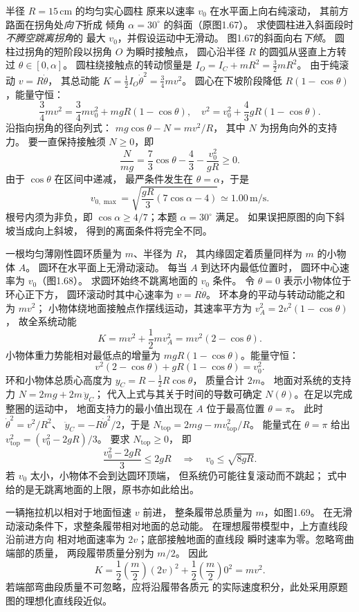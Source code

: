 半径 $R=15\,\mathrm{cm}$ 的均匀实心圆柱
原来以速率 $v_0$ 在水平面上向右纯滚动，
其前方路面在拐角处\emph{向下}折成
倾角 $\alpha=30^\circ$ 的斜面（原图1.67）。
求使圆柱进入斜面段时\emph{不腾空跳离拐角}的
最大 $v_0$，并假设运动中无滑动。
\exsolution
图1.67的斜面向右\emph{下倾}。
圆柱过拐角的短阶段以拐角 $O$ 为瞬时接触点，
圆心沿半径 $R$ 的圆弧从竖直上方转过
$\theta\in[0,\alpha]$。
圆柱绕接触点的转动惯量是
$I_O=I_C+mR^2=\frac32mR^2$。
由于纯滚动 $v=R\dot\theta$，
其总动能 $K=\frac12I_O\dot\theta^2
=\frac34mv^2$。
圆心在下坡阶段降低
$R(1-\cos\theta)$，能量守恒：
\[
\frac34mv^2
=\frac34mv_0^2+mgR(1-\cos\theta),
\quad
v^2=v_0^2+\frac43gR(1-\cos\theta).
\]
沿指向拐角的径向列式：
$mg\cos\theta-N=mv^2/R$，
其中 $N$ 为拐角向外的支持力。
要一直保持接触须 $N\ge0$，即
\[
\frac{N}{mg}=\frac73\cos\theta-\frac43
-\frac{v_0^2}{gR}\ge0.
\]
由于 $\cos\theta$ 在区间中递减，
最严条件发生在 $\theta=\alpha$，于是
\[
\boxed{v_{0,\max}=
\sqrt{\frac{gR}{3}(7\cos\alpha-4)}
\simeq1.00\,\mathrm{m/s}}.
\]
\excheck 根号内须为非负，即
$\cos\alpha\ge4/7$；本题 $\alpha=30^\circ$ 满足。
如果误把原图的向下斜坡当成向上斜坡，
得到的离面条件将完全不同。

一根均匀薄刚性圆环质量为 $m$、半径为 $R$，
其内缘固定着质量同样为 $m$ 的小物体 $A$。
圆环在水平面上无滑动滚动。
每当 $A$ 到达环内最低位置时，
圆环中心速率为 $v_0$（图1.68）。
求圆环始终不跳离地面的 $v_0$ 条件。
\exsolution
令 $\theta=0$ 表示小物体位于环心正下方，
圆环滚动时其中心速率为 $v=R\dot\theta$。
环本身的平动与转动动能之和为 $mv^2$；
小物体绕地面接触点作摆线运动，其速率平方为
$v_A^2=2v^2(1-\cos\theta)$，
故全系统动能
\[
K=mv^2+\frac12m v_A^2
=mv^2(2-\cos\theta).
\]
小物体重力势能相对最低点的增量为
$mgR(1-\cos\theta)$。能量守恒：
\[
v^2(2-\cos\theta)+gR(1-\cos\theta)=v_0^2.
\]
环和小物体总质心高度为
$y_C=R-\frac12R\cos\theta$，
质量合计 $2m$。
地面对系统的支持力
$N=2mg+2m\,\ddot y_C$；
代入上式与其关于时间的导数可确定
$N(\theta)$。在足以完成整圈的运动中，
地面支持力的最小值出现在
$A$ 位于最高位置 $\theta=\pi$。
此时 $\dot\theta^2=v^2/R^2$、
$\ddot y_C=-R\dot\theta^2/2$，于是
$N_{\mathrm{top}}=2mg-mv_{\mathrm{top}}^2/R$。
能量式在 $\theta=\pi$ 给出
$v_{\mathrm{top}}^2=(v_0^2-2gR)/3$。
要求 $N_{\mathrm{top}}\ge0$，
即
\[
\frac{v_0^2-2gR}{3}\le2gR
\quad\Longrightarrow\quad
\boxed{v_0\le\sqrt{8gR}}.
\]
\excheck 若 $v_0$ 太小，小物体不会到达圆环顶端，
但系统仍可能往复滚动而不跳起；
式中给的是无跳离地面的上限，原书亦如此给出。

一辆拖拉机以相对于地面恒速 $v$ 前进，
整条履带总质量为 $m$，如图1.69。
在无滑动滚动条件下，求整条履带相对地面的总动能。
\exsolution
在理想履带模型中，上方直线段沿前进方向
相对地面速率为 $2v$；底部接触地面的直线段
瞬时速率为零。忽略弯曲端部的质量，
两段履带质量分别为 $m/2$。
因此
\[
K=\frac12\left(\frac m2\right)(2v)^2
+\frac12\left(\frac m2\right)0^2
=\boxed{mv^2}.
\]
\excheck 若端部弯曲段质量不可忽略，应将沿履带各质元
的实际速度积分，此处采用原题图的理想化直线段近似。

